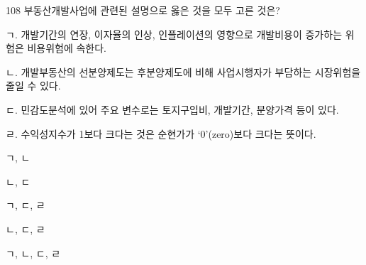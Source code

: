 \begin{question}{108}
부동산개발사업에 관련된 설명으로 옳은 것을 모두 고른 것은?
\begin{framedtext}
ㄱ. 개발기간의 연장, 이자율의 인상, 인플레이션의 영향으로 개발비용이 증가하는 위험은 비용위험에 속한다. \par
ㄴ. 개발부동산의 선분양제도는 후분양제도에 비해 사업시행자가 부담하는 시장위험을 줄일 수 있다. \par
ㄷ. 민감도분석에 있어 주요 변수로는 토지구입비, 개발기간, 분양가격 등이 있다. \par
ㄹ. 수익성지수가 1보다 크다는 것은 순현가가 ‘0’(zero)보다 크다는 뜻이다. \par
\end{framedtext}
\begin{choices}
  \item ㄱ, ㄴ
  \item ㄴ, ㄷ
  \item ㄱ, ㄷ, ㄹ
  \item ㄴ, ㄷ, ㄹ
  \item ㄱ, ㄴ, ㄷ, ㄹ
\end{choices}
\end{question}
